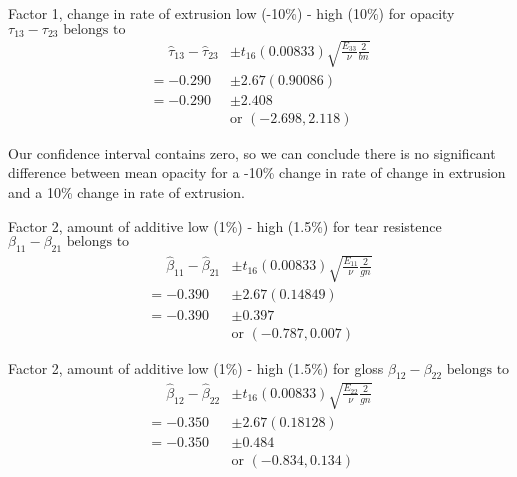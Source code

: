 \begin{enumerate}[label= (\alph*)]
    Factor 1, change in rate of extrusion low (-10\%) - high (10\%) for opacity \newline
    $\tau_{13} - \tau_{23}\text{ belongs to}$
    \begin{align*}
        \phantom{=}
        \hat{\tau}_{13} - \hat{\tau}_{23}
        & \pm
        t_{16}(0.00833)
        \sqrt{\frac{E_{33}}{\nu}\frac{2}{bn}}
        \\
        =
        -0.290
        & \pm
        2.67(0.90086)
        \\
        =
        -0.290
        & \pm
        2.408
        \\
        \phantom{\pm 0.590}
        &
        \text{or }
        (-2.698, 2.118)
    \end{align*}
    
    Our confidence interval contains zero, so we can conclude there is no significant difference between mean opacity for a -10\% change in rate of change in extrusion and a 10\% change in rate of extrusion.


    Factor 2, amount of additive low (1\%) - high (1.5\%) for tear resistence \newline
    $\beta_{11} - \beta_{21}\text{ belongs to}$
    \begin{align*}
        \phantom{=}
        \hat{\beta}_{11} - \hat{\beta}_{21}
        & \pm
        t_{16}(0.00833)
        \sqrt{\frac{E_{11}}{\nu}\frac{2}{gn}}
        \\
        =
        -0.390
        & \pm
        2.67(0.14849)
        \\
        =
        -0.390
        & \pm
        0.397
        \\
        \phantom{\pm 0.590}
        &
        \text{or }
        (-0.787, 0.007)
    \end{align*}
    
    Factor 2, amount of additive low (1\%) - high (1.5\%) for gloss \newline
    $\beta_{12} - \beta_{22}\text{ belongs to}$
    \begin{align*}
        \phantom{=}
        \hat{\beta}_{12} - \hat{\beta}_{22}
        & \pm
        t_{16}(0.00833)
        \sqrt{\frac{E_{22}}{\nu}\frac{2}{gn}}
        \\
        =
        -0.350
        & \pm
        2.67(0.18128)
        \\
        =
        -0.350
        & \pm
        0.484
        \\
        \phantom{\pm 0.590}
        &
        \text{or }
        (-0.834, 0.134)
    \end{align*}
    

\end{enumerate}
